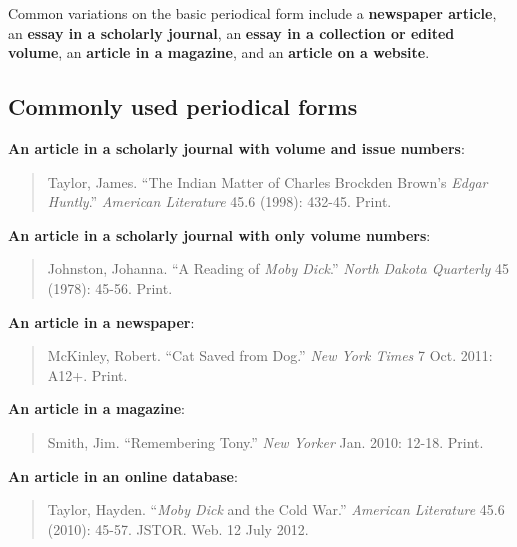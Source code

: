 Common variations on the basic periodical form include a \textbf{newspaper article}, an \textbf{essay in a scholarly journal}, an \textbf{essay in a collection or edited volume}, an \textbf{article in a magazine}, and an \textbf{article on a website}.

\subsection{Commonly used periodical forms}

\textbf{An article in a scholarly journal with volume and issue numbers}:
\begin{quote}
Taylor, James. ``The Indian Matter of Charles Brockden Brown's \emph{Edgar  Huntly}.'' \emph{American Literature} 45.6 (1998): 432-45. Print.
\end{quote}


\textbf{An article in a scholarly journal with only volume numbers}:
\begin{quote}
Johnston, Johanna. ``A Reading of \emph{Moby Dick}.'' \emph{North Dakota Quarterly}  45 (1978): 45-56. Print.
\end{quote}

\textbf{An article in a newspaper}:
\begin{quote}
McKinley, Robert. ``Cat Saved from Dog.'' \emph{New York Times} 7 Oct. 2011:  A12+. Print.
\end{quote}

\textbf{An article in a magazine}:
\begin{quote}
Smith, Jim. ``Remembering Tony.'' \emph{New Yorker} Jan. 2010: 12-18. Print.
\end{quote}

\textbf{An article in an online database}:
\begin{quote}
Taylor, Hayden. ``\emph{Moby Dick} and the Cold War.'' \emph{American Literature}  45.6 (2010): 45-57. 
JSTOR. Web. 12 July 2012.
\end{quote}

